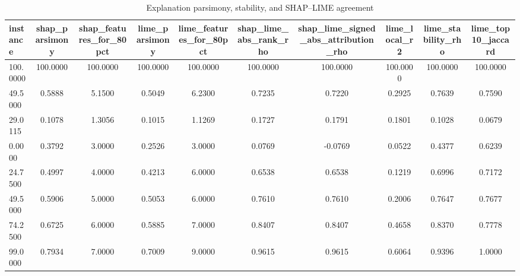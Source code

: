 \begin{table}
\centering
\caption{Explanation parsimony, stability, and SHAP--LIME agreement}
\label{tab:explanation_quality}
\begin{tabular}{lccccccccc}
\toprule
instance & shap_parsimony & shap_features_for_80pct & lime_parsimony & lime_features_for_80pct & shap_lime_abs_rank_rho & shap_lime_signed_abs_attribution_rho & lime_local_r2 & lime_stability_rho & lime_top10_jaccard \\
\midrule
100.0000 & 100.0000 & 100.0000 & 100.0000 & 100.0000 & 100.0000 & 100.0000 & 100.0000 & 100.0000 & 100.0000 \\
49.5000 & 0.5888 & 5.1500 & 0.5049 & 6.2300 & 0.7235 & 0.7220 & 0.2925 & 0.7639 & 0.7590 \\
29.0115 & 0.1078 & 1.3056 & 0.1015 & 1.1269 & 0.1727 & 0.1791 & 0.1801 & 0.1028 & 0.0679 \\
0.0000 & 0.3792 & 3.0000 & 0.2526 & 3.0000 & 0.0769 & -0.0769 & 0.0522 & 0.4377 & 0.6239 \\
24.7500 & 0.4997 & 4.0000 & 0.4213 & 6.0000 & 0.6538 & 0.6538 & 0.1219 & 0.6996 & 0.7172 \\
49.5000 & 0.5906 & 5.0000 & 0.5053 & 6.0000 & 0.7610 & 0.7610 & 0.2006 & 0.7647 & 0.7677 \\
74.2500 & 0.6725 & 6.0000 & 0.5885 & 7.0000 & 0.8407 & 0.8407 & 0.4658 & 0.8370 & 0.7778 \\
99.0000 & 0.7934 & 7.0000 & 0.7009 & 9.0000 & 0.9615 & 0.9615 & 0.6064 & 0.9396 & 1.0000 \\
\bottomrule
\end{tabular}
\end{table}
